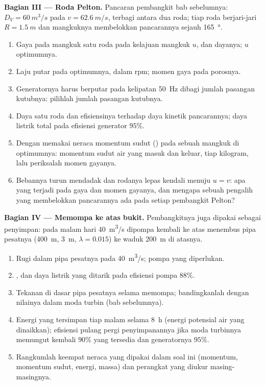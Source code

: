 \begin{problem}
\medskip
\noindent\textbf{Bagian III --- Roda Pelton.}
Pancaran pembangkit bab sebelumnya: $D_V = \qty{60}{m^3/s}$ pada $v =
\qty{62.6}{m/s}$, terbagi antara dua roda; tiap roda berjari-jari $R =
\qty{1.5}{m}$ dan mangkuknya membelokkan pancarannya sejauh \qty{165}{\degree}.
\begin{enumerate}[resume]
  \item Gaya pada mangkuk satu roda pada kelajuan mangkuk $u$, dan
        dayanya; $u$ optimumnya.
  \item Laju putar pada optimumnya, dalam rpm; momen gaya pada porosnya.
  \item Generatornya harus berputar pada kelipatan \qty{50}{Hz} dibagi
        jumlah pasangan kutubnya: pilihlah jumlah pasangan kutubnya.
  \item Daya satu roda dan efisiensinya terhadap daya kinetik
        pancarannya; daya listrik total pada efisiensi generator $95\%$.
  \item Dengan memakai neraca momentum sudut ()
        pada sebuah mangkuk di optimumnya: momentum sudut air yang
        masuk dan keluar, tiap kilogram, lalu periksalah momen gayanya.
  \item Bebannya turun mendadak dan rodanya lepas kendali menuju $u =
        v$: apa yang terjadi pada gaya dan momen gayanya, dan mengapa
        sebuah pengalih yang membelokkan pancarannya ada pada setiap
        pembangkit Pelton?
\end{enumerate}

\medskip
\noindent\textbf{Bagian IV --- Memompa ke atas bukit.}
Pembangkitnya juga dipakai sebagai penyimpan: pada malam hari \qty{40}{m^3/s} dipompa
kembali ke atas menembus pipa pesatnya (\qty{400}{m}, \qty{3}{m}, $\lambda = 0.015$) ke
waduk \qty{200}{m} di atasnya.
\begin{enumerate}[resume]
  \item Rugi  dalam pipa pesatnya pada \qty{40}{m^3/s};  pompa yang diperlukan.
  \item {}, dan daya listrik yang ditarik pada efisiensi pompa
        $88\%$.
  \item Tekanan di dasar pipa pesatnya selama memompa; bandingkanlah
        dengan nilainya dalam moda turbin (bab sebelumnya).
  \item Energi yang tersimpan tiap malam selama \qty{8}{h} (energi potensial
        air yang dinaikkan); efisiensi pulang pergi penyimpanannya jika
        moda turbinnya memungut kembali $90\%$  yang tersedia dan
        generatornya $95\%$.
  \item Rangkumlah keempat neraca yang dipakai dalam soal ini (momentum, momentum
        sudut, energi, massa) dan perangkat yang diukur masing-masingnya.
\end{enumerate}
\end{problem}

